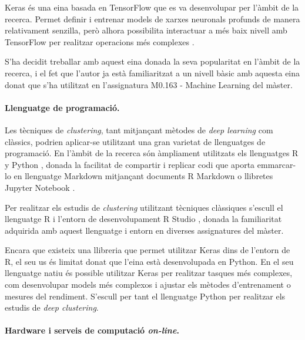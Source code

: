 \documentclass[CAT,BIB]{TFUOC}%
\begin{document}
            Keras \citep{Chollet2015} és una eina basada en TensorFlow \citep{Ghemawat2016} que es va desenvolupar per l'àmbit de la recerca. Permet definir i entrenar models de xarxes neuronals profunds de manera relativament senzilla, però alhora possibilita interactuar a més baix nivell amb TensorFlow per realitzar operacions més complexes \citep{Ketkar2021}.

            S'ha decidit treballar amb aquest eina donada la seva popularitat en l'àmbit de la recerca, i el fet que l'autor ja està familiaritzat a un nivell bàsic amb aquesta eina donat que s'ha utilitzat en l'assignatura M0.163 - Machine Learning del màster.

        \paragraph{Llenguatge de programació.}

            Les tècniques de \textit{clustering}, tant mitjançant mètodes de \textit{deep learning} com clàssics, podrien aplicar-se utilitzant una gran varietat de llenguatges de programació. En l'àmbit de la recerca són àmpliament utilitzats els llenguatges \textsf{R} \citep{RCoreTeam2017} y Python \citep{VanRossum2009} \citep{Kaggle2021}, donada la facilitat de compartir i replicar codi que aporta emmarcar-lo en llenguatge Markdown mitjançant documents R Markdown \citep{Xie2016} o llibretes Jupyter Notebook \citep{Kluyver2016}.

            Per realitzar els estudis de \textit{clustering} utilitzant tècniques clàssiques s'escull el llenguatge \textsf{R} i l'entorn de desenvolupament \textsf{R} Studio \citep{RStudioTeam2020}, donada la familiaritat adquirida amb aquest llenguatge i entorn en diverses assignatures del màster.

            Encara que existeix una llibreria que permet utilitzar Keras dins de l'entorn de \textsf{R}, el seu us és limitat donat que l'eina està desenvolupada en Python. En el seu llenguatge natiu és possible utilitzar Keras per realitzar tasques més complexes, com desenvolupar models més complexos i ajustar els mètodes d'entrenament o mesures del rendiment. S'escull per tant el llenguatge Python per realitzar els estudis de \textit{deep clustering}.

        \paragraph{Hardware i serveis de computació \textit{on-line}.}
\end{document}
